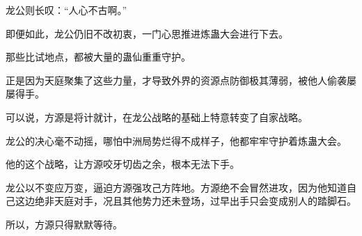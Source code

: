 \begin{this_body}
龙公则长叹：“人心不古啊。”

即便如此，龙公仍旧不改初衷，一门心思推进炼蛊大会进行下去。

那些比试地点，都被大量的蛊仙重重守护。

正是因为天庭聚集了这些力量，才导致外界的资源点防御极其薄弱，被他人偷袭屡屡得手。

可以说，方源是将计就计，在龙公战略的基础上特意转变了自家战略。

龙公的决心毫不动摇，哪怕中洲局势烂得不成样子，他都牢牢守护着炼蛊大会。

他的这个战略，让方源咬牙切齿之余，根本无法下手。

龙公以不变应万变，逼迫方源强攻己方阵地。方源绝不会冒然进攻，因为他知道自己这边绝非天庭对手，况且其他势力还未登场，过早出手只会变成别人的踏脚石。

所以，方源只得默默等待。

\end{this_body}

